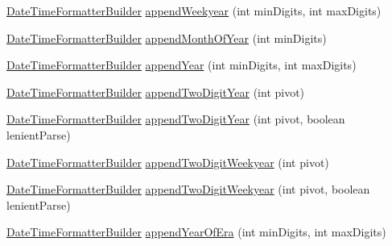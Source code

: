 \begin{DoxyCompactItemize}
\item 
\hyperlink{classorg_1_1joda_1_1time_1_1format_1_1_date_time_formatter_builder}{Date\-Time\-Formatter\-Builder} \hyperlink{classorg_1_1joda_1_1time_1_1format_1_1_date_time_formatter_builder_a5c2323d7f683697d170eef6e39d2c61e}{append\-Weekyear} (int min\-Digits, int max\-Digits)
\item 
\hyperlink{classorg_1_1joda_1_1time_1_1format_1_1_date_time_formatter_builder}{Date\-Time\-Formatter\-Builder} \hyperlink{classorg_1_1joda_1_1time_1_1format_1_1_date_time_formatter_builder_a25e3de340d21e082cffdec1ab245cda0}{append\-Month\-Of\-Year} (int min\-Digits)
\item 
\hyperlink{classorg_1_1joda_1_1time_1_1format_1_1_date_time_formatter_builder}{Date\-Time\-Formatter\-Builder} \hyperlink{classorg_1_1joda_1_1time_1_1format_1_1_date_time_formatter_builder_a1730c5a3308db0359710119351c14d16}{append\-Year} (int min\-Digits, int max\-Digits)
\item 
\hyperlink{classorg_1_1joda_1_1time_1_1format_1_1_date_time_formatter_builder}{Date\-Time\-Formatter\-Builder} \hyperlink{classorg_1_1joda_1_1time_1_1format_1_1_date_time_formatter_builder_a3f49f4976c94cd2d8684cfd23995987e}{append\-Two\-Digit\-Year} (int pivot)
\item 
\hyperlink{classorg_1_1joda_1_1time_1_1format_1_1_date_time_formatter_builder}{Date\-Time\-Formatter\-Builder} \hyperlink{classorg_1_1joda_1_1time_1_1format_1_1_date_time_formatter_builder_af985b75a6e7f58fd800dadccbf658e64}{append\-Two\-Digit\-Year} (int pivot, boolean lenient\-Parse)
\item 
\hyperlink{classorg_1_1joda_1_1time_1_1format_1_1_date_time_formatter_builder}{Date\-Time\-Formatter\-Builder} \hyperlink{classorg_1_1joda_1_1time_1_1format_1_1_date_time_formatter_builder_a07f8b68f34f89dd2a6931793a2f636a8}{append\-Two\-Digit\-Weekyear} (int pivot)
\item 
\hyperlink{classorg_1_1joda_1_1time_1_1format_1_1_date_time_formatter_builder}{Date\-Time\-Formatter\-Builder} \hyperlink{classorg_1_1joda_1_1time_1_1format_1_1_date_time_formatter_builder_a11f1fb1e79e7186cad048ffc33ba1a83}{append\-Two\-Digit\-Weekyear} (int pivot, boolean lenient\-Parse)
\item 
\hyperlink{classorg_1_1joda_1_1time_1_1format_1_1_date_time_formatter_builder}{Date\-Time\-Formatter\-Builder} \hyperlink{classorg_1_1joda_1_1time_1_1format_1_1_date_time_formatter_builder_a4d43259e510f52c75e60c701de8fc5ab}{append\-Year\-Of\-Era} (int min\-Digits, int max\-Digits)
\item 

\end{DoxyCompactItemize}
